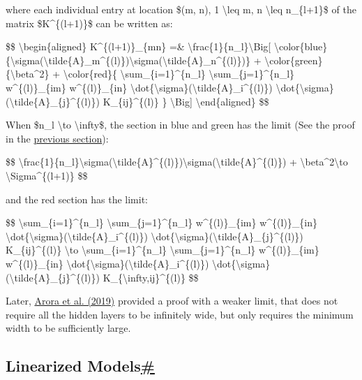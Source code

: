 where each individual entry at location \$(m, n), 1 \textbackslash leq m, n \textbackslash leq n\_\{l+1\}\$ of the matrix \$K\^{}\{(l+1)\}\$ can be written as:

\$\$ \textbackslash begin\{aligned\} K\^{}\{(l+1)\}\_\{mn\} =\& \textbackslash frac\{1\}\{n\_l\}\textbackslash Big{[} \textbackslash color\{blue\}\{\textbackslash sigma(\textbackslash tilde\{A\}\_m\^{}\{(l)\})\textbackslash sigma(\textbackslash tilde\{A\}\_n\^{}\{(l)\})\} + \textbackslash color\{green\}\{\textbackslash beta\^{}2\} + \textbackslash color\{red\}\{ \textbackslash sum\_\{i=1\}\^{}\{n\_l\} \textbackslash sum\_\{j=1\}\^{}\{n\_l\} w\^{}\{(l)\}\_\{im\} w\^{}\{(l)\}\_\{in\} \textbackslash dot\{\textbackslash sigma\}(\textbackslash tilde\{A\}\_i\^{}\{(l)\}) \textbackslash dot\{\textbackslash sigma\}(\textbackslash tilde\{A\}\_\{j\}\^{}\{(l)\}) K\_\{ij\}\^{}\{(l)\} \} \textbackslash Big{]} \textbackslash end\{aligned\} \$\$

When \$n\_l \textbackslash to \textbackslash infty\$, the section in blue and green has the limit (See the proof in the \hyperref[connection-with-gaussian-processes]{previous section}):

\$\$ \textbackslash frac\{1\}\{n\_l\}\textbackslash sigma(\textbackslash tilde\{A\}\^{}\{(l)\})\textbackslash sigma(\textbackslash tilde\{A\}\^{}\{(l)\}) + \textbackslash beta\^{}2\textbackslash to \textbackslash Sigma\^{}\{(l+1)\} \$\$

and the red section has the limit:

\$\$ \textbackslash sum\_\{i=1\}\^{}\{n\_l\} \textbackslash sum\_\{j=1\}\^{}\{n\_l\} w\^{}\{(l)\}\_\{im\} w\^{}\{(l)\}\_\{in\} \textbackslash dot\{\textbackslash sigma\}(\textbackslash tilde\{A\}\_i\^{}\{(l)\}) \textbackslash dot\{\textbackslash sigma\}(\textbackslash tilde\{A\}\_\{j\}\^{}\{(l)\}) K\_\{ij\}\^{}\{(l)\} \textbackslash to \textbackslash sum\_\{i=1\}\^{}\{n\_l\} \textbackslash sum\_\{j=1\}\^{}\{n\_l\} w\^{}\{(l)\}\_\{im\} w\^{}\{(l)\}\_\{in\} \textbackslash dot\{\textbackslash sigma\}(\textbackslash tilde\{A\}\_i\^{}\{(l)\}) \textbackslash dot\{\textbackslash sigma\}(\textbackslash tilde\{A\}\_\{j\}\^{}\{(l)\}) K\_\{\textbackslash infty,ij\}\^{}\{(l)\} \$\$

Later, \href{https://arxiv.org/abs/1904.11955}{Arora et al. (2019)} provided a proof with a weaker limit, that does not require all the hidden layers to be infinitely wide, but only requires the minimum width to be sufficiently large.

\subsection{\texorpdfstring{Linearized Models\hyperref[linearized-models]{\#}}{Linearized Models\#}}\label{linearized-models}

